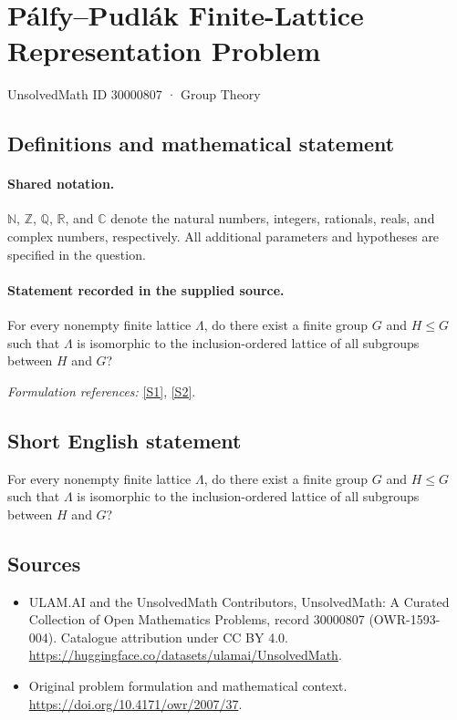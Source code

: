 \documentclass[11pt]{article}
\newcommand{\sref}[2]{\hyperlink{source:#1:#2}{[S#2]}}
\begin{document}
\setcounter{section}{30000806}
\section{Pálfy–Pudlák Finite-Lattice Representation Problem}\label{30000807}
{\small UnsolvedMath ID 30000807 · Group Theory}
\subsection{Definitions and mathematical statement}

\paragraph{Shared notation.}$\mathbb N$, $\mathbb Z$, $\mathbb Q$, $\mathbb R$, and $\mathbb C$ denote the natural numbers, integers, rationals, reals, and complex numbers, respectively. All additional parameters and hypotheses are specified in the question.


\paragraph{Statement recorded in the supplied source.}
For every nonempty finite lattice $\Lambda$, do there exist a finite group $G$ and $H\leq G$ such that $\Lambda$ is isomorphic to the inclusion-ordered lattice of all subgroups between $H$ and $G$?
\par\smallskip\textit{Formulation references:} \sref{30000807}{1}, \sref{30000807}{2}.
\subsection{Short English statement}
For every nonempty finite lattice $\Lambda$, do there exist a finite group $G$ and $H\leq G$ such that $\Lambda$ is isomorphic to the inclusion-ordered lattice of all subgroups between $H$ and $G$?
\subsection{Sources}
\begin{itemize}
\item[\hypertarget{source:30000807:1}{S1}] ULAM.AI and the UnsolvedMath Contributors, UnsolvedMath: A Curated Collection of Open Mathematics Problems, record 30000807 (OWR-1593-004). Catalogue attribution under CC BY 4.0.
\url{https://huggingface.co/datasets/ulamai/UnsolvedMath}.
\item[\hypertarget{source:30000807:2}{S2}] Original problem formulation and mathematical context.
\url{https://doi.org/10.4171/owr/2007/37}.
\end{itemize}
\label{end:30000807}
\end{document}
